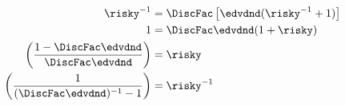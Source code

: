 \begin{equation}\begin{gathered}\begin{aligned}
\risky^{-1}  & =   \DiscFac  \left[\edvdnd(\risky^{-1}+1)\right]
\\ 1 & =  \DiscFac \edvdnd (1+\risky)
\\ \left(\frac{1-\DiscFac \edvdnd}{\DiscFac \edvdnd}\right)  & =  \risky
\\ \left(\frac{1}{(\DiscFac \edvdnd)^{-1}-1}\right)  & =  \risky^{-1}
\end{aligned}\end{gathered}\end{equation}
